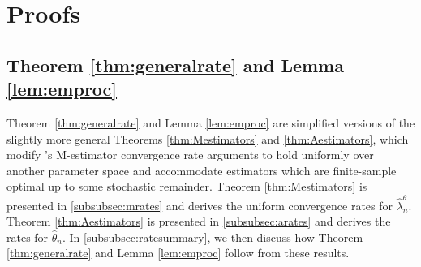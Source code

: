\documentclass[12pt]{article}
\theoremstyle{myplain}
\theoremstyle{definition}
\theoremstyle{definition}
\theoremstyle{remark}
\numberwithin{equation}{section}
\begin{document}
\section{Proofs}
\label{appendix:proofs}
\subsection{Theorem \ref{thm:generalrate} and Lemma \ref{lem:emproc}}\label{proof:convergence}
Theorem \ref{thm:generalrate} and Lemma \ref{lem:emproc} are simplified versions of the slightly more general Theorems \ref{thm:Mestimators} and  \ref{thm:Aestimators}, which modify \cite{shen1994}'s M-estimator convergence rate arguments to hold uniformly over another parameter space and accommodate estimators which are finite-sample optimal up to some stochastic remainder. Theorem \ref{thm:Mestimators} is presented in \ref{subsubsec:mrates} and  derives the uniform convergence rates for $\widehat{\lambda}_{n}^\theta$. Theorem \ref{thm:Aestimators} is presented in \ref{subsubsec:arates} and derives the rates for $\widehat{\theta}_n$. In \ref{subsubsec:ratesummary}, we then discuss how Theorem \ref{thm:generalrate} and Lemma \ref{lem:emproc} follow from these results.
\end{document}
